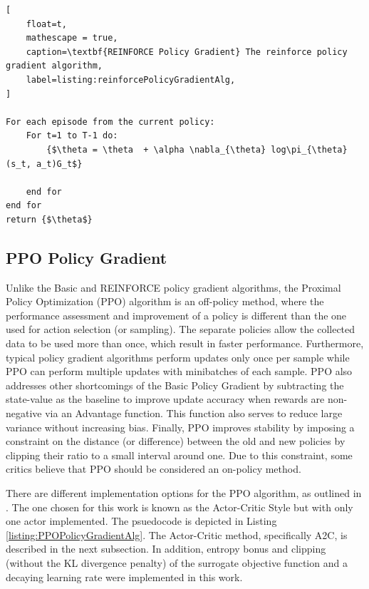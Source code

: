\documentclass[conference]{IEEEtran}
\begin{document}
\begin{lstlisting}[
    float=t,
    mathescape = true,
    caption=\textbf{REINFORCE Policy Gradient} The reinforce policy gradient algorithm,
    label=listing:reinforcePolicyGradientAlg,
]

For each episode from the current policy:
    For t=1 to T-1 do:
        {$\theta = \theta  + \alpha \nabla_{\theta} log\pi_{\theta}(s_t, a_t)G_t$}

    end for
end for
return {$\theta$}
\end{lstlisting}

\subsection{PPO Policy Gradient}
Unlike the Basic and REINFORCE policy gradient algorithms, the Proximal Policy Optimization (PPO) algorithm is an off-policy method, where the performance assessment and improvement of a policy is different than the one used for action selection (or sampling). The separate policies allow the collected data to be used more than once, which result in faster performance. Furthermore, typical policy gradient algorithms perform updates only once per sample while PPO can perform multiple updates with minibatches of each sample. PPO also addresses other shortcomings of the Basic Policy Gradient by subtracting the state-value as the baseline to improve update accuracy when rewards are non-negative via an Advantage function. This function also serves to reduce large variance without increasing bias. Finally, PPO improves stability by imposing a constraint on the distance (or difference) between the old and new policies by clipping their ratio to a small interval around one. Due to this constraint, some critics believe that PPO should be considered an on-policy method.

There are different implementation options for the PPO algorithm, as outlined in \cite{schulman2017proximal}. The one chosen for this work is known as the Actor-Critic Style but with only one actor implemented. The psuedocode is depicted in Listing \ref{listing:PPOPolicyGradientAlg}. The Actor-Critic method, specifically A2C, is described in the next subsection. In addition, entropy bonus and clipping (without the KL divergence penalty) of the surrogate objective function and a decaying learning rate were implemented in this work.
\end{document}
